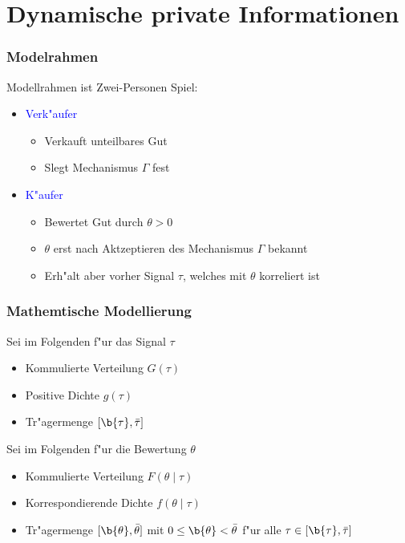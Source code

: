 \section{Dynamische private Informationen}

\begin{frame}
  \frametitle{Modelrahmen}
  \justifying
  Modellrahmen ist Zwei-Personen Spiel:
  \begin{itemize}
    \item \textcolor{blue}{Verk"aufer}
    \begin{itemize}
      \item Verkauft unteilbares Gut
      \item Slegt Mechanismus $\Gamma$ fest
    \end{itemize}
    \item \textcolor{blue}{K"aufer}
    \begin{itemize}
      \item Bewertet Gut durch $\theta > 0$
      \item $\theta$ erst nach Aktzeptieren des Mechanismus $\Gamma$ bekannt
      \item Erh"alt aber vorher Signal $\tau$, welches mit $\theta$ korreliert ist
    \end{itemize}
  \end{itemize}
\end{frame}

\begin{frame}
  \frametitle{Mathemtische Modellierung}
  \justifying
  Sei im Folgenden f"ur das Signal $\tau$
  \begin{itemize}
    \item Kommulierte Verteilung $G(\tau)$
    \item Positive Dichte $g(\tau)$
    \item Tr"agermenge $[ \b{\tau} , \bar{\tau} ]$
  \end{itemize}
  Sei im Folgenden f"ur die Bewertung $\theta$
  \begin{itemize}
    \item Kommulierte Verteilung $F(\theta \mid \tau)$
    \item Korrespondierende Dichte $f(\theta \mid \tau)$
    \item Tr"agermenge $[ \b{\theta} , \bar{\theta} ]$ mit $0 \leq \b{\theta} < \bar{\theta} $ f"ur alle $\tau \in [ \b{\tau} , \bar{\tau} ]$
  \end{itemize}
\end{frame}

